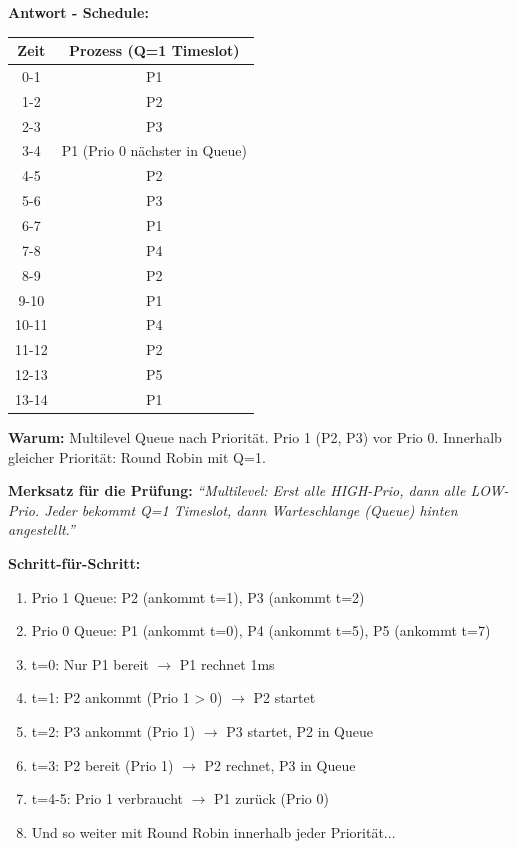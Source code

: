 \documentclass[a4paper,11pt]{article}
\begin{document}
\begin{tcolorbox}[colback=green!15!white,colframe=green!70!black,title=\textbf{Lösung Aufgabe 6}]
\textbf{Antwort - Schedule:}

\begin{center}
\begin{tabular}{|c|c|}
\hline
Zeit & Prozess (Q=1 Timeslot) \\
\hline
0-1 & P1 \\
1-2 & P2 \\
2-3 & P3 \\
3-4 & P1 (Prio 0 nächster in Queue) \\
4-5 & P2 \\
5-6 & P3 \\
6-7 & P1 \\
7-8 & P4 \\
8-9 & P2 \\
9-10 & P1 \\
10-11 & P4 \\
11-12 & P2 \\
12-13 & P5 \\
13-14 & P1 \\
\hline
\end{tabular}
\end{center}

\textbf{Warum:} Multilevel Queue nach Priorität. Prio 1 (P2, P3) vor Prio 0. Innerhalb gleicher Priorität: Round Robin mit Q=1.

\textbf{Merksatz für die Prüfung:} \textit{``Multilevel: Erst alle HIGH-Prio, dann alle LOW-Prio. Jeder bekommt Q=1 Timeslot, dann Warteschlange (Queue) hinten angestellt.''}

\textbf{Schritt-für-Schritt:}
\begin{enumerate}[leftmargin=*]
  \item Prio 1 Queue: P2 (ankommt t=1), P3 (ankommt t=2)
  \item Prio 0 Queue: P1 (ankommt t=0), P4 (ankommt t=5), P5 (ankommt t=7)
  \item t=0: Nur P1 bereit $\rightarrow$ P1 rechnet 1ms
  \item t=1: P2 ankommt (Prio 1 > 0) $\rightarrow$ P2 startet
  \item t=2: P3 ankommt (Prio 1) $\rightarrow$ P3 startet, P2 in Queue
  \item t=3: P2 bereit (Prio 1) $\rightarrow$ P2 rechnet, P3 in Queue
  \item t=4-5: Prio 1 verbraucht $\rightarrow$ P1 zurück (Prio 0)
  \item Und so weiter mit Round Robin innerhalb jeder Priorität...
\end{enumerate}
\end{tcolorbox}
\end{document}
